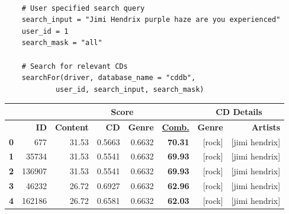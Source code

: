\documentclass{article}
\begin{document}
\begin{lstlisting}

    # User specified search query
    search_input = "Jimi Hendrix purple haze are you experienced"
    user_id = 1
    search_mask = "all"

    # Search for relevant CDs
    searchFor(driver, database_name = "cddb", 
            user_id, search_input, search_mask)
\end{lstlisting}

\begin{table}[!htbp]
    \begin{tabular}{rr|rrrr|rr|}
        \cline{3-8}
        \multicolumn{1}{l}{} & \multicolumn{1}{l|}{} & \multicolumn{4}{c|}{\textbf{Score}}   & \multicolumn{2}{c|}{\textbf{CD Details}}                                                                                                                            \\ \hline
        \textbf{}            & \textbf{ID}           & \multicolumn{1}{r|}{\textbf{Content}} & \multicolumn{1}{r|}{\textbf{CD}}         & \multicolumn{1}{r|}{\textbf{Genre}} & {\ul \textbf{Comb.}} & \multicolumn{1}{r|}{\textbf{Genre}} & \textbf{Artists}      \\ \hline
        \textbf{0}           & 677                   & 31.53                                 & 0.5663                                   & 0.6632                              & \textbf{70.31}       & {[}rock{]}                          & {[}jimi hendrix{]}    \\
        \textbf{1}           & 35734                 & 31.53                                 & 0.5541                                   & 0.6632                              & \textbf{69.93}       & {[}rock{]}                          & {[}jimi hendrix{]}    \\
        \textbf{2}           & 136907                & 31.53                                 & 0.5541                                   & 0.6632                              & \textbf{69.93}       & {[}rock{]}                          & {[}jimi hendrix{]}    \\
        \textbf{3}           & 46232                 & 26.72                                 & 0.6927                                   & 0.6632                              & \textbf{62.96}       & {[}rock{]}                          & {[}jimi hendrix{]}    \\
        \textbf{4}           & 162186                & 26.72                                 & 0.6581                                   & 0.6632                              & \textbf{62.03}       & {[}rock{]}                          & {[}jimi hendrix{]}    \\

\end{tabular}
\end{table}
\end{document}
